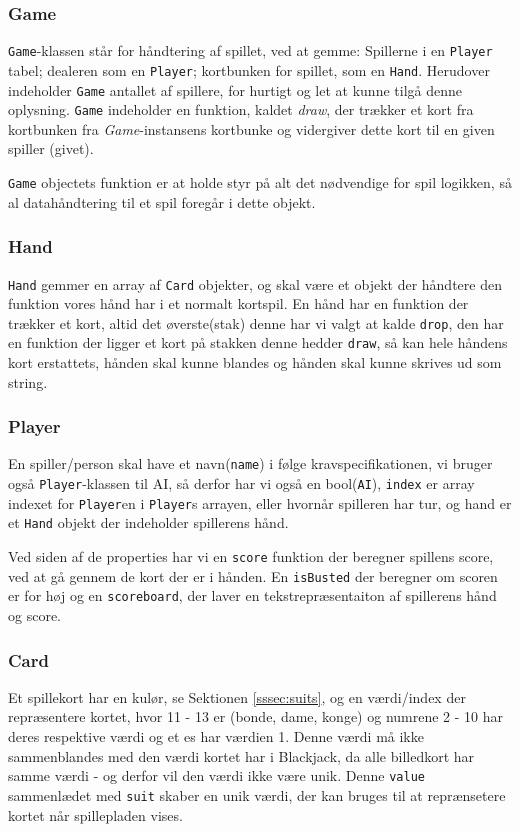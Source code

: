 \documentclass[a4paper]{article}
\begin{document}
      \subsubsection*{Game}
      \texttt{Game}-klassen står for håndtering af spillet, ved at gemme: Spillerne i en \texttt{Player} tabel; dealeren som en \texttt{Player}; kortbunken for spillet, som en \texttt{Hand}.
      Herudover indeholder \texttt{Game} antallet af spillere, for hurtigt og let at kunne tilgå denne oplysning.
      \texttt{Game} indeholder en funktion, kaldet \textit{draw}, der trækker et kort fra kortbunken fra \textit{Game}-instansens kortbunke og vidergiver dette kort til en given spiller (givet).

      \texttt{Game} objectets funktion er at holde styr på alt det nødvendige for spil logikken,
      så al datahåndtering til et spil foregår i dette objekt.

      \subsubsection*{Hand}
      \texttt{Hand} gemmer en array af \texttt{Card} objekter, og skal være et objekt der håndtere den funktion vores hånd har i et normalt kortspil.
      En hånd har en funktion der trækker et kort, altid det øverste(stak) denne har vi valgt at kalde \lstinline$drop$,
      den har en funktion der ligger et kort på stakken denne hedder \lstinline$draw$,
      så kan hele håndens kort erstattets, hånden skal kunne blandes og hånden skal kunne skrives ud som string.

      \subsubsection*{Player}
      En spiller/person skal have et navn(\lstinline$name$) i følge kravspecifikationen,
      vi bruger også \texttt{Player}-klassen til AI, så derfor har vi også en bool(\lstinline$AI$),
      \lstinline$index$ er array indexet for \texttt{Player}en i \texttt{Player}s arrayen, eller hvornår spilleren har tur,
      og hand er et \texttt{Hand} objekt der indeholder spillerens hånd.

      Ved siden af de properties har vi en \lstinline$score$ funktion der beregner spillens score,
      ved at gå gennem de kort der er i hånden.
      En \lstinline$isBusted$ der beregner om scoren er for høj og en \lstinline$scoreboard$,
      der laver en tekstrepræsentaiton af spillerens hånd og score.

      \subsubsection*{Card}
      Et spillekort har en kulør, se Sektionen \ref{sssec:suits}, og en værdi/index der repræsentere kortet,
      hvor 11 - 13 er (bonde, dame, konge) og numrene 2 - 10 har deres respektive værdi og et es har værdien 1.
      Denne værdi må ikke sammenblandes med den værdi kortet har i Blackjack,
      da alle billedkort har samme værdi - og derfor vil den værdi ikke være unik.
      Denne \lstinline$value$ sammenlædet med \lstinline$suit$ skaber en unik værdi,
      der kan bruges til at reprænsetere kortet når spillepladen vises.
\end{document}
